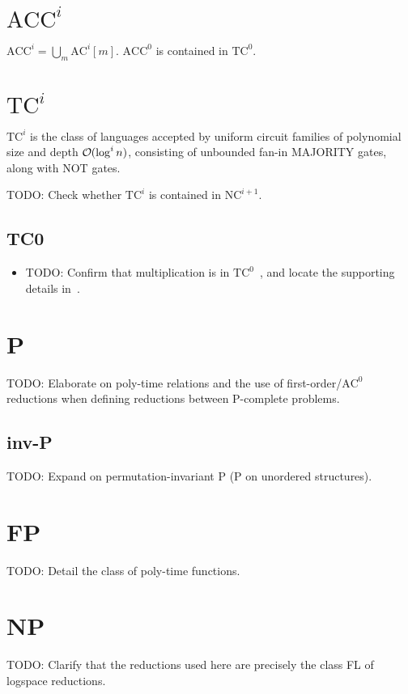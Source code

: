 \section{\texorpdfstring{$\text{ACC}^i$}{ACC\string^i}}
$\text{ACC}^i = \bigcup_m \text{AC}^i[m]$. $\text{ACC}^0$ is contained in $\text{TC}^0$.

\section{\texorpdfstring{$\text{TC}^i$}{TC\string^i}}
$\text{TC}^i$ is the class of languages accepted by uniform circuit families 
of polynomial size and depth $\bigO(\log^i n)$, consisting of unbounded fan-in MAJORITY
gates, along with NOT gates.

TODO: Check whether $\text{TC}^i$ is contained in $\text{NC}^{i + 1}$.
\subsection{TC0}
\begin{itemize}
\item TODO: Confirm that multiplication is in $\text{TC}^0$~\cite{BussLectureNotes}, and locate the supporting details in~\cite{doi:10.1137/0213028}.
\end{itemize}


\section{P}
TODO: Elaborate on poly-time relations and the use of first-order/$\text{AC}^0$ reductions when defining reductions between P-complete problems.

\subsection{inv-P}
TODO: Expand on permutation-invariant P (P on unordered structures).

\section{FP}
TODO: Detail the class of poly-time functions.

\section{NP}
TODO: Clarify that the reductions used here are precisely the class FL of logspace reductions.

